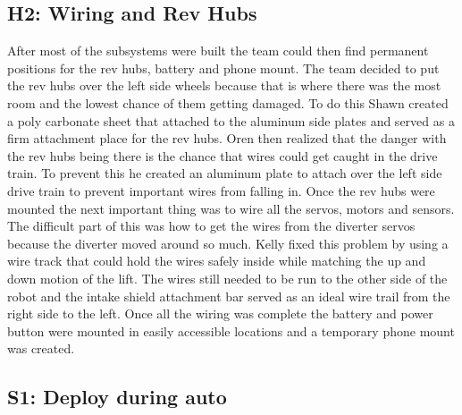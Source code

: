 \documentclass{article}
\begin{document}
\subsection{H2: Wiring and Rev Hubs}

After most of the subsystems were built the team could then find permanent positions for the rev hubs, battery and phone mount. The team decided to put the rev hubs over the left side wheels because that is where there was the most room and the lowest chance of them getting damaged. To do this Shawn created a poly carbonate sheet that attached to the aluminum side plates and served as a firm attachment place for the rev hubs. Oren then realized that the danger with the rev hubs being there is the chance that wires could get caught in the drive train. To prevent this he created an aluminum plate to attach over the left side drive train to prevent important wires from falling in. Once the rev hubs were mounted the next important thing was to wire all the servos, motors and sensors. The difficult part of this was how to get the wires from the diverter servos because the diverter moved around so much. Kelly fixed this problem by using a wire track that could hold the wires safely inside while matching the up and down motion of the lift. The wires still needed to be run to the other side of the robot and the intake shield attachment bar served as an ideal wire trail from the right side to the left. Once all the wiring was complete the battery and power button were mounted in easily accessible locations and a temporary phone mount was created.


\subsection{S1: Deploy during auto}
\end{document}
